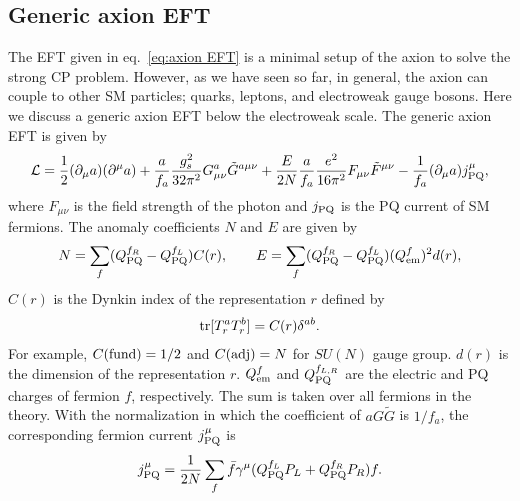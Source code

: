 \documentclass[11pt,a4paper]{article}
\begin{document}
\subsection{Generic axion EFT}
The EFT given in eq.~\eqref{eq:axion EFT} is a minimal setup of the axion to solve the strong CP problem. However, as we have seen so far, in general, the axion can couple to other SM particles; quarks, leptons, and electroweak gauge bosons. Here we discuss a generic axion EFT below the electroweak scale. The generic axion EFT is given by
\begin{align}
    {\cal L} = \frac{1}{2} (\partial_\mu a)(\partial^\mu a) + \frac{a}{f_a} \frac{g_s^2}{32\pi^2} G_{\mu\nu}^a \tilde G^{a\mu\nu} + \frac{E}{2N} \frac{a}{f_a} \frac{e^2}{16\pi^2} F_{\mu\nu} \tilde F^{\mu\nu} - \frac{1}{f_a} (\partial_\mu a) j_{\rm PQ}^\mu,
\end{align}
where $F_{\mu\nu}$ is the field strength of the photon and $j_{\rm PQ}$ is the PQ current of SM fermions.
The anomaly coefficients $N$ and $E$ are given by
\begin{align}
    N = \sum_f (Q_{\rm PQ}^{f_R} - Q_{\rm PQ}^{f_L}) C(r), \qquad
    E = \sum_f (Q_{\rm PQ}^{f_R} - Q_{\rm PQ}^{f_L}) (Q_{\rm em}^f)^2 d(r), \label{eq:anomaly coefficients}
\end{align}
$C(r)$ is the Dynkin index of the representation $r$ defined by
\begin{align}
    {\rm tr}[T_r^a T_r^b] = C(r) \delta^{ab}.
\end{align}
For example, $C({\rm fund}) = 1/2$ and $C({\rm adj}) = N$ for $SU(N)$ gauge group. $d(r)$ is the dimension of the representation $r$. $Q_{\rm em}^f$ and $Q_{\rm PQ}^{f_{L,R}}$ are the electric and PQ charges of fermion $f$, respectively. The sum is taken over all fermions in the theory.
With the normalization in which the coefficient of \(aG\tilde G\) is \(1/f_a\), the corresponding fermion current $j_{\rm PQ}^\mu$ is
\begin{align}
    j_{\rm PQ}^\mu = \frac{1}{2N} \sum_f \bar f \gamma^\mu ( Q_{\rm PQ}^{f_L} P_L + Q_{\rm PQ}^{f_R} P_R )f.
\end{align}
\end{document}
